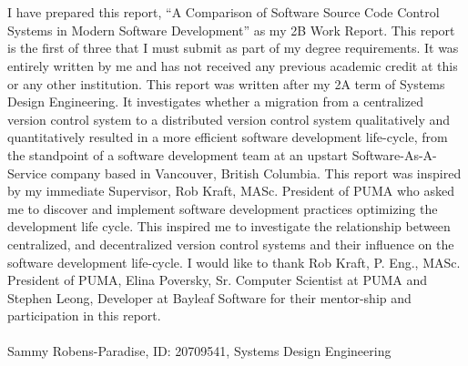\documentclass[11pt,a4paper,roman]{moderncv}
\begin{document}
\\
\newline
\\
\makelettertitle
\justifying
\indent
I have prepared this report, “A Comparison of Software Source Code Control Systems in Modern Software Development” as my 2B Work Report. This report is the first of three that I must submit as part of my degree requirements. It was entirely written by me and has not received any previous academic credit at this or any other institution. This report was written after my 2A term of Systems Design Engineering. It investigates whether a migration from a centralized version control system to a distributed version control system qualitatively and quantitatively resulted in a more efficient software development life-cycle, from the standpoint of a software development team at an upstart Software-As-A-Service company based in Vancouver, British Columbia. This report was inspired by my immediate Supervisor, Rob Kraft, MASc. President of PUMA who asked me to discover and implement software development practices optimizing the development life cycle. This inspired me to investigate the relationship between centralized, and decentralized version control systems and their influence on the software development life-cycle. I would like to thank Rob Kraft, P. Eng., MASc. President of PUMA, Elina Poversky, Sr. Computer Scientist at PUMA and Stephen Leong, Developer at Bayleaf Software for their mentor-ship and participation in this report. \\

\\
Sammy Robens-Paradise, ID: 20709541, Systems Design Engineering

\vspace{0.5cm}
\end{document}
